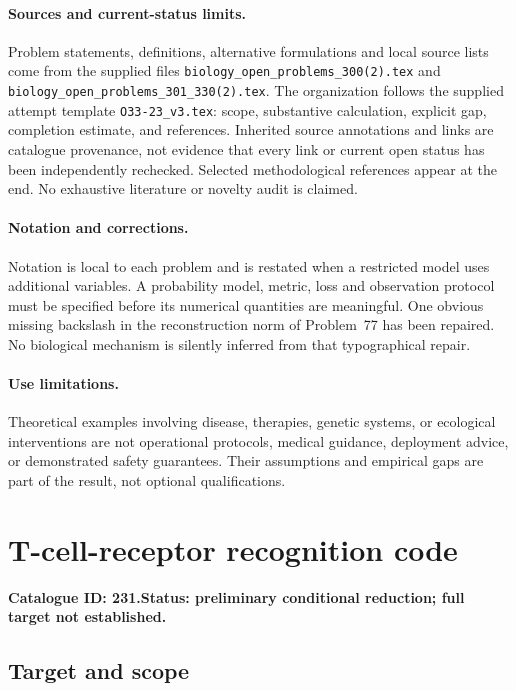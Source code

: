 \documentclass[11pt]{article}
\begin{document}
\paragraph{Sources and current-status limits.}
Problem statements, definitions, alternative formulations and local source lists
come from the supplied files
\texttt{biology\_open\_problems\_300(2).tex} and
\texttt{biology\_open\_problems\_301\_330(2).tex}.
The organization follows the supplied attempt template
\texttt{O33-23\_v3.tex}: scope, substantive calculation, explicit gap,
completion estimate, and references. Inherited source annotations and links are
catalogue provenance, not evidence that every link or current open status has
been independently rechecked. Selected methodological references appear at the
end. No exhaustive literature or novelty audit is claimed.

\paragraph{Notation and corrections.}
Notation is local to each problem and is restated when a restricted model uses
additional variables. A probability model, metric, loss and observation protocol
must be specified before its numerical quantities are meaningful. One obvious
missing backslash in the reconstruction norm of Problem~77 has been repaired.
No biological mechanism is silently inferred from that typographical repair.

\paragraph{Use limitations.}
Theoretical examples involving disease, therapies, genetic systems, or ecological
interventions are not operational protocols, medical guidance, deployment advice,
or demonstrated safety guarantees. Their assumptions and empirical gaps are part
of the result, not optional qualifications.

\setcounter{section}{230}
\section{T-cell-receptor recognition code}
\label{prob:231}
\noindent\textbf{Catalogue ID: 231.}\quad \textbf{Status: preliminary conditional reduction; full target not established.}
\subsection{Target and scope}
\end{document}
